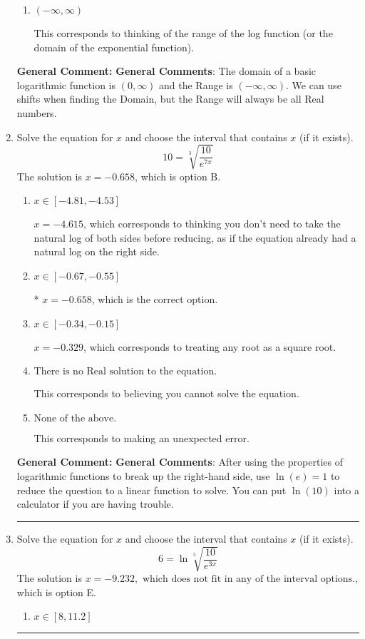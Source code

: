\documentclass{extbook}[14pt]
\newcommand{\litem}[1]{\item #1

\rule{\textwidth}{0.4pt}}
\begin{document}
\begin{enumerate}
{\begin{enumerate}[label=\Alph*.]
$[1, \infty)$, which corresponds to using the vertical shift when shifting the Domain AND including the endpoint.
\item \( (-\infty, \infty) \)

This corresponds to thinking of the range of the log function (or the domain of the exponential function).
\end{enumerate}

\textbf{General Comment:} \textbf{General Comments}: The domain of a basic logarithmic function is $(0, \infty)$ and the Range is $(-\infty, \infty)$. We can use shifts when finding the Domain, but the Range will always be all Real numbers.
}
\litem{
 Solve the equation for $x$ and choose the interval that contains $x$ (if it exists).
\[  10 = \sqrt[3]{\frac{10}{e^{7x}}} \]The solution is \( x = -0.658 \), which is option B.\begin{enumerate}[label=\Alph*.]
\item \( x \in [-4.81, -4.53] \)

$x = -4.615$, which corresponds to thinking you don't need to take the natural log of both sides before reducing, as if the equation already had a natural log on the right side.
\item \( x \in [-0.67, -0.55] \)

* $x = -0.658$, which is the correct option.
\item \( x \in [-0.34, -0.15] \)

$x = -0.329$, which corresponds to treating any root as a square root.
\item \( \text{There is no Real solution to the equation.} \)

This corresponds to believing you cannot solve the equation.
\item \( \text{None of the above.} \)

This corresponds to making an unexpected error.
\end{enumerate}

\textbf{General Comment:} \textbf{General Comments}: After using the properties of logarithmic functions to break up the right-hand side, use $\ln(e) = 1$ to reduce the question to a linear function to solve. You can put $\ln(10)$ into a calculator if you are having trouble.
}
\litem{
 Solve the equation for $x$ and choose the interval that contains $x$ (if it exists).
\[  6 = \ln{\sqrt[5]{\frac{10}{e^{3x}}}} \]The solution is \( x = -9.232, \text{ which does not fit in any of the interval options.} \), which is option E.\begin{enumerate}[label=\Alph*.]
\item \( x \in [8, 11.2] \)


\end{enumerate}}
\end{enumerate}
\end{document}

